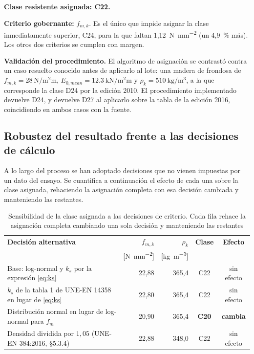 \documentclass[11pt,a4paper]{article}
\begin{document}
\noindent\textbf{Clase resistente asignada: C22.}

\noindent\textbf{Criterio gobernante:} $f_{m,k}$. Es el único que impide asignar la clase inmediatamente superior, C24, para la que faltan 1,12~\si{\newton\per\square\milli\meter} (un 4,9~\si{\percent} más). Los otros dos criterios se cumplen con margen.

\medskip
\noindent\textbf{Validación del procedimiento.} El algoritmo de asignación se contrastó
contra un caso resuelto conocido antes de aplicarlo al lote: una madera de frondosa de
$f_{m,k} = \SI{28}{\newton\per\square\milli\meter}$,
$E_{0,mean} = \SI{12.3}{\kilo\newton\per\square\milli\meter}$ y
$\rho_{k} = \SI{510}{\kilo\gram\per\cubic\meter}$, a la que corresponde la clase D24 por
la edición 2010. El procedimiento implementado devuelve D24, y devuelve D27 al aplicarlo
sobre la tabla de la edición 2016, coincidiendo en ambos casos con la fuente.

\subsection{Robustez del resultado frente a las decisiones de cálculo}
\label{sec:robustez}

A lo largo del proceso se han adoptado decisiones que no vienen impuestas por un dato
del ensayo. Se cuantifica a continuación el efecto de cada una sobre la clase asignada,
rehaciendo la asignación completa con esa decisión cambiada y manteniendo las restantes.

\begin{table}[H]
\centering
\caption[Sensibilidad de la clase asignada a las decisiones de criterio]{Sensibilidad de la clase asignada a las decisiones de criterio. Cada fila rehace la asignación completa cambiando una sola decisión y manteniendo las restantes}
\begin{tabular}{p{7.2cm} r r c c}
\toprule
\textbf{Decisión alternativa} & \textbf{$f_{m,k}$} & \textbf{$\rho_{k}$} & \textbf{Clase} & \textbf{Efecto} \\
 & [\si{\newton\per\square\milli\meter}] & [\si{\kilo\gram\per\cubic\meter}] & & \\
\midrule
Base: log-normal y $k_{s}$ por la expresión \eqref{eq:ks} & 22,88 & 365,4 & C22 & sin efecto \\
$k_{s}$ de la tabla 1 de UNE-EN 14358 en lugar de \eqref{eq:ks} & 22,80 & 365,4 & C22 & sin efecto \\
Distribución normal en lugar de log-normal para $f_{m}$ & 20,90 & 365,4 & \textbf{C20} & \textbf{cambia} \\
Densidad dividida por $1{,}05$ (UNE-EN 384:2016, \S5.3.4) & 22,88 & 348,0 & C22 & sin efecto \\
\bottomrule
\end{tabular}
\end{table}
\end{document}
